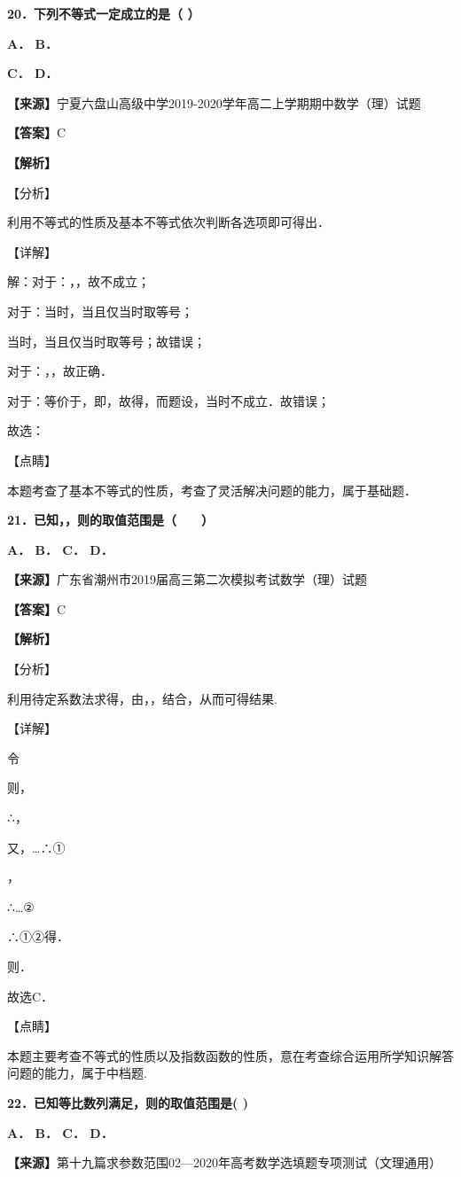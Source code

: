 \textbf{20．下列不等式一定成立的是（ ）}

\textbf{A． B．}

\textbf{C． D．}

\textbf{【来源】}宁夏六盘山高级中学2019-2020学年高二上学期期中数学（理）试题

\textbf{【答案】}C

\textbf{【解析】}

【分析】

利用不等式的性质及基本不等式依次判断各选项即可得出．

【详解】

解：对于：，，故不成立；

对于：当时，当且仅当时取等号；

当时，当且仅当时取等号；故错误；

对于：，，故正确．

对于：等价于，即，故得，而题设，当时不成立．故错误；

故选：

【点睛】

本题考查了基本不等式的性质，考查了灵活解决问题的能力，属于基础题．

\textbf{21．已知，，则的取值范围是（　　）}

\textbf{A． B． C． D．}

\textbf{【来源】}广东省潮州市2019届高三第二次模拟考试数学（理）试题

\textbf{【答案】}C

\textbf{【解析】}

【分析】

利用待定系数法求得，由，，结合，从而可得结果.

【详解】

令

则，

∴，

又，\ldots∴①

，

∴\ldots②

∴①②得．

则．

故选C．

【点睛】

本题主要考查不等式的性质以及指数函数的性质，意在考查综合运用所学知识解答问题的能力，属于中档题.

\textbf{22．已知等比数列满足，则的取值范围是( )}

\textbf{A． B． C． D．}

\textbf{【来源】}第十九篇求参数范围02---2020年高考数学选填题专项测试（文理通用）

